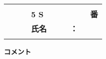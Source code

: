 \begin{center}
\begin{tabular}{|p{11cm}|} \hline
\\
{\large\textbf{　　　5 S　　　　　　番}} \vspace*{0.25cm} \\
{\large\textbf{　　　氏名　　　：}} \\
\\ \hline
\end{tabular}
\end{center}
\vspace*{0.15cm}

\begin{center}
\begin{itembox}[r]{\textbf{コメント}}
\hspace*{12.5cm} \\
\hspace*{12.5cm} \\
\hspace*{12.5cm} \\
\hspace*{12.5cm} \\
\hspace*{12.5cm} \\
\hspace*{12.5cm} \\
\hspace*{12.5cm} \\
\hspace*{12.5cm} \\
\hspace*{12.5cm} \\
\hspace*{12.5cm} \\
\hspace*{12.5cm} \\
\hspace*{12.5cm} \\
\hspace*{12.5cm} \\
\end{itembox}
\end{center}
\renewcommand{\arraystretch}{1}
